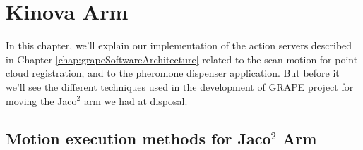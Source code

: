 
\chapter{Kinova Arm} \label{chap:kinovaArmChapter}

In this chapter, we'll explain our implementation of the action servers described in Chapter \ref{chap:grapeSoftwareArchitecture} related to the scan motion for point cloud registration, and to the pheromone dispenser application.
But before it we'll see the different techniques used in the development of \ac{GRAPE} project for moving the Jaco$^2$ arm we had at disposal.

\section{Motion execution methods for Jaco$^2$ Arm}

